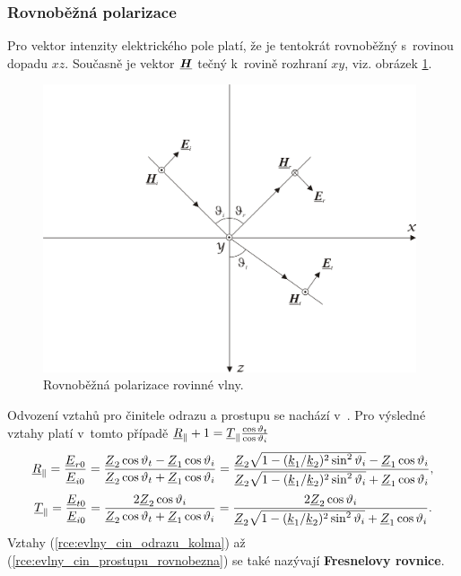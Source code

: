 \subsubsection*{Rovnoběžná polarizace}
Pro vektor intenzity elektrického pole platí, že je tentokrát rovnoběžný s~rovinou dopadu $xz$. Současně je vektor $\mbox{\underline{\boldmath$H$}}$ tečný k~rovině rozhraní $xy$, viz. obrázek \ref{obr:evlny_rovnobezna_polarizace}.
\begin{figure}[!h]
	\centering
	\includegraphics[width=11cm]{evlny_rovnobezna_polarizace.png}
	\caption{Rovnoběžná polarizace rovinné vlny. \cite{emp}}
	\label{obr:evlny_rovnobezna_polarizace}
\end{figure}
Odvození vztahů pro činitele odrazu a prostupu se nachází v~\cite[str. 95]{emp}. Pro výsledné vztahy platí v~tomto případě ${\underline{R}}_{\parallel} + 1 = {\underline{T}}_{\parallel}\frac{\cos\vartheta_{t}}{\cos\vartheta_{i}}$
\begin{equation}
	{\underline{R}}_{\parallel} = \frac{{\underline{E}}_{r0}}{{\underline{E}}_{i0}} = \frac{{\underline{Z}}_{2}\cos\vartheta_{t}-{\underline{Z}}_{1}\cos\vartheta_{i}}{{\underline{Z}}_{2}\cos\vartheta_{t}+{\underline{Z}}_{1}\cos\vartheta_{i}} = \frac{{\underline{Z}}_{2}\sqrt{1-({\underline{k}}_{1}/{\underline{k}}_{2})^{2}\sin^{2}\vartheta_{i}}-{\underline{Z}}_{1}\cos\vartheta_{i}}{{\underline{Z}}_{2}\sqrt{1-({\underline{k}}_{1}/{\underline{k}}_{2})^{2}\sin^{2}\vartheta_{i}}+{\underline{Z}}_{1}\cos\vartheta_{i}},
	\label{rce:evlny_cin_odrazu_rovnobezna}
\end{equation}
\begin{equation}
	{\underline{T}}_{\parallel} = \frac{{\underline{E}}_{t0}}{{\underline{E}}_{i0}} = \frac{2{\underline{Z}}_{2}\cos\vartheta_{i}}{{\underline{Z}}_{2}\cos\vartheta_{t}+{\underline{Z}}_{1}\cos\vartheta_{i}} = \frac{2{\underline{Z}}_{2}\cos\vartheta_{i}}{{\underline{Z}}_{2}\sqrt{1-({\underline{k}}_{1}/{\underline{k}}_{2})^{2}\sin^{2}\vartheta_{i}}+{\underline{Z}}_{1}\cos\vartheta_{i}}.
	\label{rce:evlny_cin_prostupu_rovnobezna}
\end{equation}
Vztahy (\ref{rce:evlny_cin_odrazu_kolma}) až (\ref{rce:evlny_cin_prostupu_rovnobezna}) se také nazývají {\bf Fresnelovy rovnice}.

